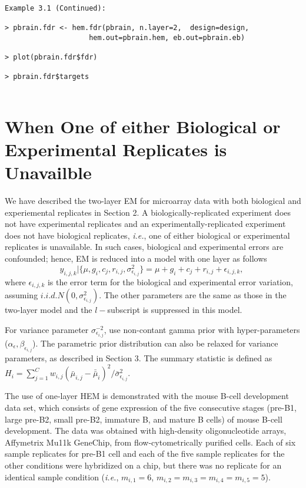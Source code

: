 \documentclass[12pt]{article}
\begin{document}
\begin{verbatim}

Example 3.1 (Continued):

> pbrain.fdr <- hem.fdr(pbrain, n.layer=2,  design=design, 
                    hem.out=pbrain.hem, eb.out=pbrain.eb)

> plot(pbrain.fdr$fdr)

> pbrain.fdr$targets


\end{verbatim}





\section{When One of either Biological or Experimental Replicates is Unavailble}
We have described the two-layer EM for microarray data 
with both biological and experiemental replicates in Section 2. 
A biologically-replicated experiment does not have experimental replicates and
an experimentally-replicated experiment does not have biological replicates,
{\it i.e.}, one of either biological or experimental replicates is unavailable.
In such cases, biological and experimental errors are confounded; hence,  
EM is reduced into a model with one layer as follows
\begin{equation}\label{em1}
y_{i,j,k} | \{ \mu, g_i, c_j, r_{i,j}, \sigma^2_{\epsilon_{i,j}}\}= \mu + g_i + c_j + r_{i,j} + \epsilon_{i,j,k},\;
\end{equation}
where $\epsilon_{i,j,k}$ is the error term for the biological and experimental error variation,
assuming $i.i.d. N(0,\sigma^2_{\epsilon_{i,j}})$.
The other parameters are the same as those in the two-layer model and
the $l-$subscript is suppressed in this model.


For variance parameter $\sigma_{\epsilon_{i,j}}^{-2}$,
use non-contant gamma prior with hyper-parameters ($\alpha_\epsilon, \beta_{\epsilon_{i,j}}$).
The parametric prior distribution can also be relaxed for variance parameters, as described in Section 3. 
The summary statistic is defined as
$
H_i = \sum_{j=1}^C w_{i,j} (\bar{\mu}_{i,j}-\bar{\bar{\mu}}_{i})^2 /
                             \bar{\sigma}^2_{\epsilon_{i,j}}.
$


The use of one-layer HEM is demonstrated with the mouse B-cell development data set,
which consists of gene expression of the five consecutive stages
(pre-B1, large pre-B2, small pre-B2, immature B, and mature B cells)
of mouse B-cell development. The data was obtained with high-density oligonucleotide arrays,
Affymetrix Mu11k GeneChip\texttrademark,
from flow-cytometrically purified cells.
Each of six sample replicates for pre-B1 cell and each of the five sample replicates for the other conditions
were hybridized on a chip, but there was no replicate for an identical sample condition
({\it i.e.}, $m_{i,1}=6$, $m_{i,2}=m_{i,3}=m_{i,4}=m_{i,5}=5$).
\end{document}
